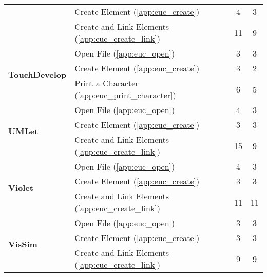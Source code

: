 \begin{table*}[!htb]
\begin{tabularx}{\textwidth}{lXcc}
& Create Element (\ref{app:euc_create})                & 4 & 3 \\
& Create and Link Elements (\ref{app:euc_create_link}) & 11 & 9 \\
\midrule
\multirow{3}{*}{\textbf{TouchDevelop}}
& Open File (\ref{app:euc_open})                       & 3 & 3 \\
& Create Element (\ref{app:euc_create})                & 3 & 2 \\
& Print a Character (\ref{app:euc_print_character})    & 6 & 5 \\
\midrule
\multirow{3}{*}{\textbf{UMLet}}
& Open File (\ref{app:euc_open})                       & 4  & 3 \\
& Create Element (\ref{app:euc_create})                & 3  & 3 \\
& Create and Link Elements (\ref{app:euc_create_link}) & 15 & 9 \\
\midrule
\multirow{3}{*}{\textbf{Violet}}
& Open File (\ref{app:euc_open})                       & 4  & 3 \\
& Create Element (\ref{app:euc_create})                & 3  & 3 \\
& Create and Link Elements (\ref{app:euc_create_link}) & 11 & 11 \\
\midrule
\multirow{3}{*}{\textbf{VisSim}}
& Open File (\ref{app:euc_open})                       & 3 & 3 \\
& Create Element (\ref{app:euc_create})                & 3 & 3 \\
& Create and Link Elements (\ref{app:euc_create_link}) & 9 & 9 \\
\bottomrule
\end{tabularx}
\end{table*}

